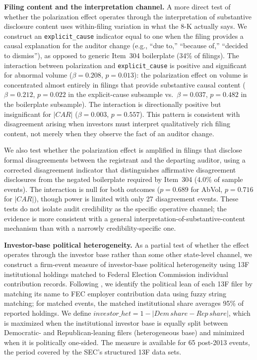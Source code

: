 \documentclass[12pt]{article}
\begin{document}
\textbf{Filing content and the interpretation channel.}
A more direct test of whether the polarization effect operates through
the interpretation of substantive disclosure content uses within-filing
variation in what the 8-K actually says. We construct an
\texttt{explicit\_cause} indicator equal to one when the filing provides
a causal explanation for the auditor change (e.g., ``due to,'' ``because
of,'' ``decided to dismiss''), as opposed to generic Item~304 boilerplate
(34\% of filings). The interaction between polarization and
\texttt{explicit\_cause} is positive and significant for abnormal volume
($\beta = 0.208$, $p = 0.013$): the polarization effect on volume is
concentrated almost entirely in filings that provide substantive causal
content ($\beta = 0.212$, $p = 0.022$ in the explicit-cause subsample
vs.\ $\beta = 0.037$, $p = 0.482$ in the boilerplate subsample). The
interaction is directionally positive but insignificant for $|CAR|$
($\beta = 0.003$, $p = 0.557$). This pattern is consistent with
disagreement arising when investors must interpret qualitatively rich
filing content, not merely when they observe the fact of an auditor change.

We also test whether the polarization effect is amplified in filings
that disclose formal disagreements between the registrant and the
departing auditor, using a corrected disagreement indicator that
distinguishes affirmative disagreement disclosures from the negated
boilerplate required by Item~304 (4.0\% of sample events). The
interaction is null for both outcomes ($p = 0.689$ for AbVol,
$p = 0.716$ for $|CAR|$), though power is limited with only 27
disagreement events. These tests do not isolate audit credibility as
the specific operative channel; the evidence is more consistent with a
general interpretation-of-substantive-content mechanism than with a
narrowly credibility-specific one.

\textbf{Investor-base political heterogeneity.}
As a partial test of whether the effect operates through the investor
base rather than some other state-level channel, we construct a
firm-event measure of investor-base political heterogeneity using 13F
institutional holdings matched to Federal Election Commission individual
contribution records. Following \citet{wintoki2019}, we identify the
political lean of each 13F filer by matching its name to FEC employer
contribution data using fuzzy string matching; for matched events, the
matched institutional share averages 95\% of reported holdings. We
define $\mathit{investor\_het} = 1 - |\mathit{Dem\,share} -
\mathit{Rep\,share}|$, which is maximized when the institutional
investor base is equally split between Democratic- and
Republican-leaning filers (heterogeneous base) and minimized when it is
politically one-sided. The measure is available for 65 post-2013 events,
the period covered by the SEC's structured 13F data sets.
\end{document}
